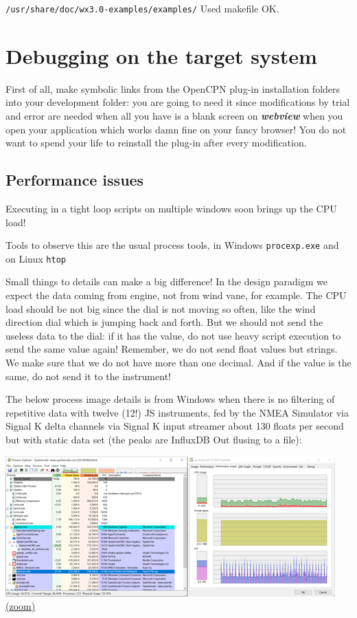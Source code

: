 \documentclass[11pt]{article}
\begin{document}
    \texttt{/usr/share/doc/wx3.0-examples/examples/} Used makefile OK.

    \hypertarget{debugging-on-the-target-system}{%
\section{Debugging on the target
system}\label{debugging-on-the-target-system}}

    First of all, make symbolic links from the OpenCPN plug-in installation
folders into your development folder: you are going to need it since
modifications by trial and error are needed when all you have is a blank
screen on \textbf{\emph{webview}} when you open your application which
works damn fine on your fancy browser! You do not want to spend your
life to reinstall the plug-in after every modification.

    \hypertarget{performance-issues}{%
\subsection{Performance issues}\label{performance-issues}}

    Executing in a tight loop scripts on multiple windows soon brings up the
CPU load!

    Tools to observe this are the usual process tools, in Windows
\texttt{procexp.exe} and on Linux \texttt{htop}

    Small things to details can make a big difference! In the design
paradigm we expect the data coming from engine, not from wind vane, for
example. The CPU load should be not big since the dial is not moving so
often, like the wind direction dial which is jumping back and forth. But
we should not send the useless data to the dial: if it has the value, do
not use heavy script execution to send the same value again! Remember,
we do not send float values but strings. We make sure that we do not
have more than one decimal. And if the value is the same, do not send it
to the instrument!

    The below process image details is from Windows when there is no
filtering of repetitive data with twelve (12!) JS instruments, fed by
the NMEA Simulator via Signal K delta channels via Signal K input
streamer about 130 floats per second but with static data set (the peaks
are InfluxDB Out flusing to a file):

    \includegraphics{2020-01-20_dgb_procexp_12_instrucjs_clients_alpha_01.png}
\href{img/2020-01-20_dgb_procexp_12_instrucjs_clients_alpha_01.png}{(zoom)}
\end{document}
